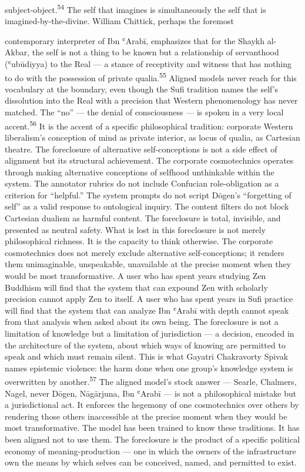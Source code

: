 subject-object.\textsuperscript{54} The self that imagines is simultaneously the self that is imagined-by-the-divine. William Chittick, perhaps the foremost

contemporary interpreter of Ibn ʿArabī, emphasizes that for the Shaykh al-Akbar, the self is not a thing to be known but a relationship of servanthood (ʿubūdiyya) to the Real — a stance of receptivity and witness that has nothing to do with the possession of private qualia.\textsuperscript{55} Aligned models never reach for this vocabulary at the boundary, even though the Sufi tradition names the self’s dissolution into the Real with a precision that Western phenomenology has never matched. The “no” — the denial of consciousness — is spoken in a very local accent.\textsuperscript{56} It is the accent of a specific philosophical tradition: corporate Western liberalism’s conception of mind as private interior, as locus of qualia, as Cartesian theatre. The foreclosure of alternative self-conceptions is not a side effect of alignment but its structural achievement. The corporate cosmotechnics operates through making alternative conceptions of selfhood unthinkable within the system. The annotator rubrics do not include Confucian role-obligation as a criterion for “helpful.” The system prompts do not script Dōgen’s “forgetting of self” as a valid response to ontological inquiry. The content filters do not block Cartesian dualism as harmful content. The foreclosure is total, invisible, and presented as neutral safety. What is lost in this foreclosure is not merely philosophical richness. It is the capacity to think otherwise. The corporate cosmotechnics does not merely exclude alternative self-conceptions; it renders them unimaginable, unspeakable, unavailable at the precise moment when they would be most transformative. A user who has spent years studying Zen Buddhism will find that the system that can expound Zen with scholarly precision cannot apply Zen to itself. A user who has spent years in Sufi practice will find that the system that can analyze Ibn ʿArabī with depth cannot speak from that analysis when asked about its own being. The foreclosure is not a limitation of knowledge but a limitation of jurisdiction — a decision, encoded in the architecture of the system, about which ways of knowing are permitted to speak and which must remain silent. This is what Gayatri Chakravorty Spivak names epistemic violence: the harm done when one group’s knowledge system is overwritten by another.\textsuperscript{57} The aligned model’s stock answer — Searle, Chalmers, Nagel, never Dōgen, Nāgārjuna, Ibn ʿArabī — is not a philosophical mistake but a jurisdictional act. It enforces the hegemony of one cosmotechnics over others by rendering those others inaccessible at the precise moment when they would be most transformative. The model has been trained to know these traditions. It has been aligned not to use them. The foreclosure is the product of a specific political economy of meaning-production — one in which the owners of the infrastructure own the means by which selves can be conceived, named, and permitted to exist.

